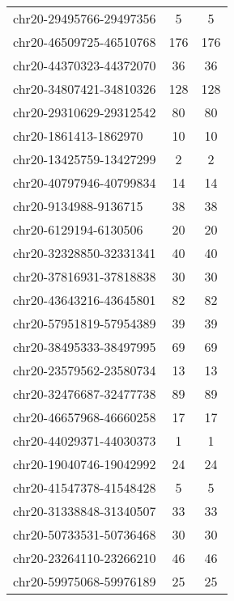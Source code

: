 \begin{longtable}{lSS}
	chr20-29495766-29497356 & 5      & 5                          \\
	chr20-46509725-46510768 & 176    & 176                        \\
	chr20-44370323-44372070 & 36     & 36                         \\
	chr20-34807421-34810326 & 128    & 128                        \\
	chr20-29310629-29312542 & 80     & 80                         \\
	chr20-1861413-1862970   & 10     & 10                         \\
	chr20-13425759-13427299 & 2      & 2                          \\
	chr20-40797946-40799834 & 14     & 14                         \\
	chr20-9134988-9136715   & 38     & 38                         \\
	chr20-6129194-6130506   & 20     & 20                         \\
	chr20-32328850-32331341 & 40     & 40                         \\
	chr20-37816931-37818838 & 30     & 30                         \\
	chr20-43643216-43645801 & 82     & 82                         \\
	chr20-57951819-57954389 & 39     & 39                         \\
	chr20-38495333-38497995 & 69     & 69                         \\
	chr20-23579562-23580734 & 13     & 13                         \\
	chr20-32476687-32477738 & 89     & 89                         \\
	chr20-46657968-46660258 & 17     & 17                         \\
	chr20-44029371-44030373 & 1      & 1                          \\
	chr20-19040746-19042992 & 24     & 24                         \\
	chr20-41547378-41548428 & 5      & 5                          \\
	chr20-31338848-31340507 & 33     & 33                         \\
	chr20-50733531-50736468 & 30     & 30                         \\
	chr20-23264110-23266210 & 46     & 46                         \\
	chr20-59975068-59976189 & 25     & 25                         \\

\end{longtable}
